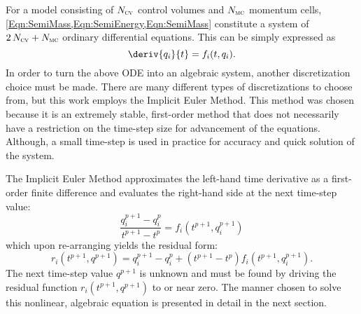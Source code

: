 For a model consisting of $N_{\text{\textsc{cv}}}$ control volumes and $N_{\text{\textsc{mc}}}$ momentum cells, \cref{Eqn:SemiMass,Eqn:SemiEnergy,Eqn:SemiMass} constitute a system of $2\,N_{\text{\textsc{cv}}} + N_{\text{\textsc{mc}}}$ ordinary differential equations.
This can be simply expressed as
\begin{equation}
    \deriv{q_i}{t} = f_i(t,q_i).
\end{equation}
In order to turn the above ODE into an algebraic system, another discretization choice must be made.
There are many different types of discretizations to choose from, but this work employs the Implicit Euler Method.
This method was chosen because it is an extremely stable, first-order method that does not necessarily have a restriction on the time-step size for advancement of the equations.
Although, a small time-step is used in practice for accuracy and quick solution of the system.

The Implicit Euler Method approximates the left-hand time derivative as a first-order finite difference and evaluates the right-hand side at the next time-step value:
\begin{equation}
    \frac{q^{p+1}_i - q^p_i}{t^{p+1}-t^p} = f_i(t^{p+1},q^{p+1}_i)
\end{equation}
which upon re-arranging yields the residual form:
\begin{equation}
    r_i(t^{p+1},q^{p+1}) =  q^{p+1}_i - q^p_i + (t^{p+1}-t^p) f_i(t^{p+1},q^{p+1}_i).
\end{equation}
The next time-step value $q^{p+1}$ is unknown and must be found by driving the residual function $r_i(t^{p+1},q^{p+1})$ to or near zero.
The manner chosen to solve this nonlinear, algebraic equation is presented in detail in the next section.





